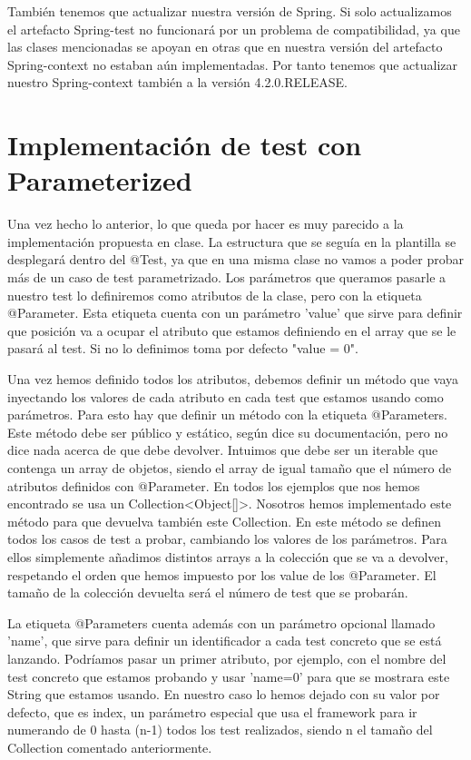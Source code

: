 \documentclass[a4paper]{article}
\begin{document}
También tenemos que actualizar nuestra versión de Spring. Si solo actualizamos el artefacto Spring-test no funcionará por un problema de compatibilidad, ya que las clases mencionadas se apoyan en otras que en nuestra versión del artefacto Spring-context no estaban aún implementadas. Por tanto tenemos que actualizar nuestro Spring-context también a la versión 4.2.0.RELEASE.

\section{Implementación de test con Parameterized}

Una vez hecho lo anterior, lo que queda por hacer es muy parecido a la implementación propuesta en clase. La estructura que se seguía en la plantilla se desplegará dentro del @Test, ya que en una misma clase no vamos a poder probar más de un caso de test parametrizado. Los parámetros que queramos pasarle a nuestro test lo definiremos como atributos de la clase, pero con la etiqueta @Parameter. Esta etiqueta cuenta con un parámetro 'value' que sirve para definir que posición va a ocupar el atributo que estamos definiendo en el array que se le pasará al test. Si no lo definimos toma por defecto "value = 0".

Una vez hemos definido todos los atributos, debemos definir un método que vaya inyectando los valores de cada atributo en cada test que estamos usando como parámetros. Para esto hay que definir un método con la etiqueta @Parameters. Este método debe ser público y estático, según dice su documentación, pero no dice nada acerca de que debe devolver. Intuimos que debe ser un iterable que contenga un array de objetos, siendo el array de igual tamaño que el número de atributos definidos con @Parameter. En todos los ejemplos que nos hemos encontrado se usa un Collection<Object[]>. Nosotros hemos implementado este método para que devuelva también este Collection. En este método se definen todos los casos de test a probar, cambiando los valores de los parámetros. Para ellos simplemente añadimos distintos arrays a la colección que se va a devolver, respetando el orden que hemos impuesto por los value de los @Parameter. El tamaño de la colección devuelta será el número de test que se probarán.

La etiqueta @Parameters cuenta además con un parámetro opcional llamado 'name', que sirve para definir un identificador a cada test concreto que se está lanzando. Podríamos pasar un primer atributo, por ejemplo, con el nombre del test concreto que estamos probando y usar 'name={0}' para que se mostrara este String que estamos usando. En nuestro caso lo hemos dejado con su valor por defecto, que es {index}, un parámetro especial que usa el framework para ir numerando de 0 hasta (n-1) todos los test realizados, siendo n el tamaño del Collection comentado anteriormente. 
\end{document}
